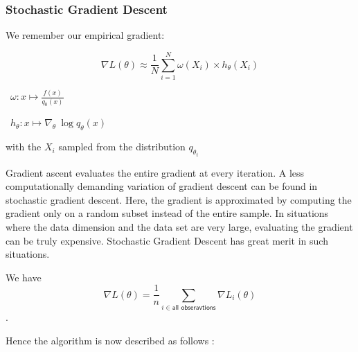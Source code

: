 \pagebreak

\subsubsection{Stochastic Gradient Descent}

We remember our empirical gradient:

$$\nabla L(\theta) \approx \frac 1 N \displaystyle\sum_{i = 1}^N \omega(X_i) \times h_\theta(X_i)$$

\faAngleRight \ $\omega : x \mapsto \frac{f(x)}{q_0(x)}$

\faAngleRight \ $h_\theta : x \mapsto \nabla_\theta \ \log q_\theta(x)$

\bigskip

with the $X_i$ sampled from the distribution $q_{\theta_t}$

\bigskip

Gradient ascent evaluates the entire gradient at every iteration. A less computationally demanding variation of gradient descent can be found in stochastic gradient descent. Here, the gradient is approximated by computing the gradient only on a random subset instead of the entire sample. In situations where the data dimension and the data set are very large, evaluating the gradient can be truly expensive. Stochastic Gradient Descent has great merit in such situations. 

\bigskip

We have
$$\nabla L(\theta) = \frac 1 n \sum_{i \in \textsf{all obseravtions}} \nabla L_i(\theta)$$.

\bigskip

Hence the algorithm is now described as follows :

